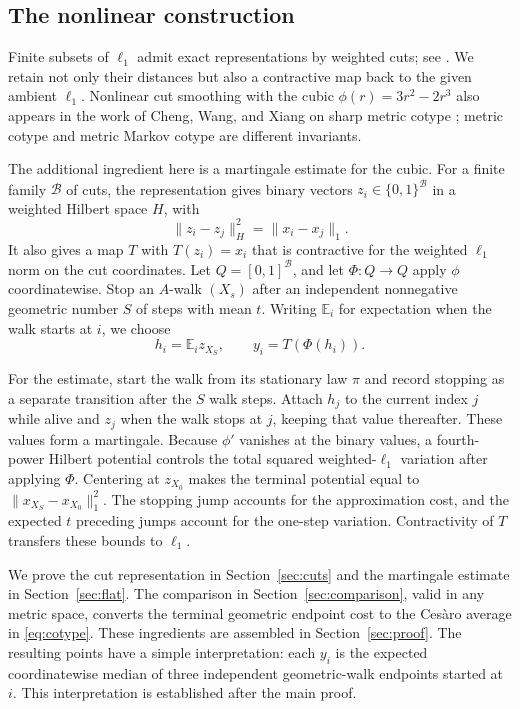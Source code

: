 \documentclass[11pt]{article}
\theoremstyle{definition}
\theoremstyle{remark}
\numberwithin{equation}{section}
\newcommand{\E}{\mathbb E}
\begin{document}
\subsection*{The nonlinear construction}
Finite subsets of $\ell_1$ admit exact representations by weighted
cuts; see \cite{DezaLaurent97}. We retain not only their distances
but also a contractive map back to the given ambient $\ell_1$.
Nonlinear cut smoothing with the cubic $\phi(r)=3r^2-2r^3$
also appears in the work of Cheng, Wang, and Xiang on sharp
metric cotype \cite{ChengWangXiang26}; metric cotype and metric
Markov cotype are different invariants.

The additional ingredient here is a martingale estimate for the
cubic. For a finite family $\mathcal B$ of cuts, the representation
gives binary vectors $z_i\in\{0,1\}^{\mathcal B}$ in a weighted
Hilbert space $H$, with
\[
 \|z_i-z_j\|_H^2=\|x_i-x_j\|_1.
\]
It also gives a map $T$ with $T(z_i)=x_i$ that is contractive for
the weighted $\ell_1$ norm on the cut coordinates. Let
$Q=[0,1]^{\mathcal B}$, and let $\Phi:Q\to Q$ apply $\phi$
coordinatewise. Stop an $A$-walk $(X_s)$ after an independent
nonnegative geometric number $S$ of steps with mean $t$. Writing $\E_i$ for
expectation when the walk starts at $i$, we choose
\[
 h_i=\E_i z_{X_S},\qquad y_i=T(\Phi(h_i)).
\]

For the estimate, start the walk from its stationary law $\pi$
and record stopping as a separate transition after the $S$ walk
steps. Attach $h_j$ to the current index $j$ while alive and
$z_j$ when the walk stops at $j$, keeping that value thereafter.
These values form a martingale. Because $\phi'$ vanishes at the
binary values, a fourth-power Hilbert potential controls the
total squared weighted-$\ell_1$ variation after applying $\Phi$.
Centering at $z_{X_0}$ makes the terminal potential equal to
$\|x_{X_S}-x_{X_0}\|_1^2$. The stopping jump accounts for the
approximation cost, and the expected $t$ preceding jumps account
for the one-step variation. Contractivity of $T$ transfers these
bounds to $\ell_1$.

We prove the cut representation in Section~\ref{sec:cuts} and the
martingale estimate in Section~\ref{sec:flat}. The comparison in
Section~\ref{sec:comparison}, valid in any metric space, converts
the terminal geometric endpoint cost to the Ces\`aro average in
\eqref{eq:cotype}. These ingredients are
assembled in Section~\ref{sec:proof}. The resulting points have a
simple interpretation: each $y_i$ is the expected coordinatewise
median of three independent geometric-walk endpoints started at
$i$. This interpretation is established after the main proof.
\end{document}
